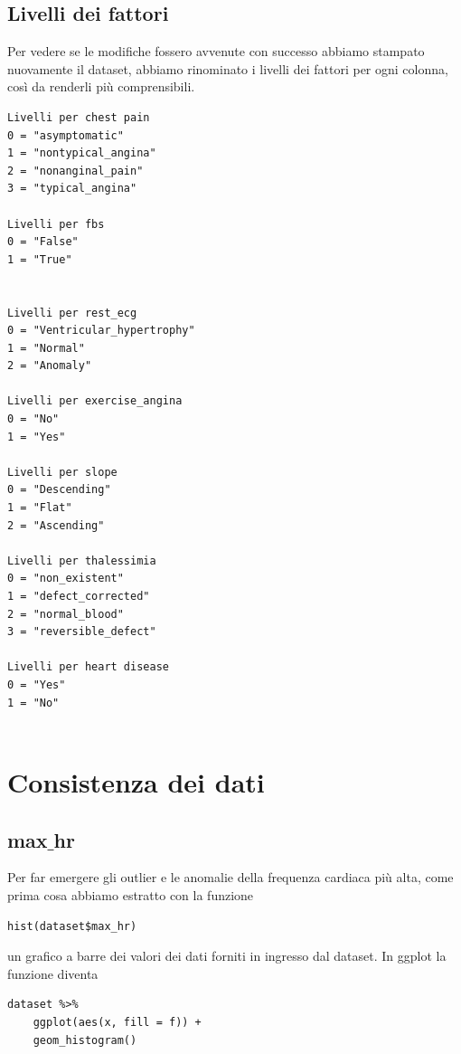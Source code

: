 \documentclass{article}
\begin{document}
\subsection { Livelli dei fattori }
Per vedere se le modifiche fossero avvenute con successo abbiamo stampato nuovamente il dataset, abbiamo rinominato i livelli dei fattori per ogni colonna, così da renderli più comprensibili.\\
\begin{lstlisting}
Livelli per chest pain
0 = "asymptomatic"
1 = "nontypical_angina"
2 = "nonanginal_pain"
3 = "typical_angina"

Livelli per fbs
0 = "False"
1 = "True"


Livelli per rest_ecg
0 = "Ventricular_hypertrophy"
1 = "Normal"
2 = "Anomaly"

Livelli per exercise_angina
0 = "No"
1 = "Yes"

Livelli per slope
0 = "Descending"
1 = "Flat"
2 = "Ascending"

Livelli per thalessimia
0 = "non_existent"
1 = "defect_corrected"
2 = "normal_blood"
3 = "reversible_defect"

Livelli per heart disease
0 = "Yes"
1 = "No"


 \end{lstlisting}

\section { Consistenza dei dati }
\subsection{ max$\_$hr }
Per far emergere gli outlier e le anomalie della frequenza cardiaca più alta, come prima cosa abbiamo estratto con la funzione 
\begin{lstlisting}
hist(dataset$max_hr)
 \end{lstlisting}
 un grafico a barre dei valori dei dati forniti in ingresso dal dataset. In ggplot la funzione diventa 
\begin{lstlisting}
dataset %>%
	ggplot(aes(x, fill = f)) + 
	geom_histogram()
 \end{lstlisting}
\end{document}
